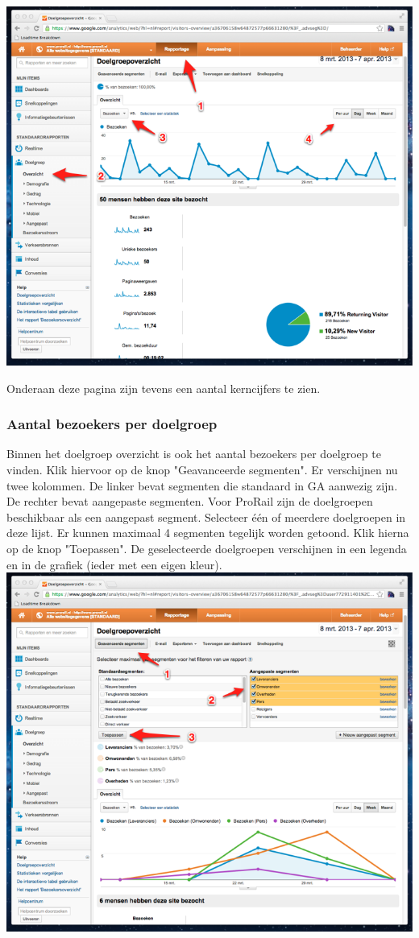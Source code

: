 \includegraphics[width=\textwidth]{img/stats1.png}

Onderaan deze pagina zijn tevens een aantal kerncijfers te zien.

\clearpage
\subsubsection{Aantal bezoekers per doelgroep}

Binnen het doelgroep overzicht is ook het aantal bezoekers per doelgroep te vinden. Klik hiervoor op de knop "Geavanceerde segmenten". Er verschijnen nu twee kolommen. De linker bevat segmenten die standaard in GA aanwezig zijn. De rechter bevat aangepaste segmenten. Voor ProRail zijn de doelgroepen beschikbaar als een aangepast segment. Selecteer \'{e}\'{e}n of meerdere doelgroepen in deze lijst. Er kunnen maximaal 4 segmenten tegelijk worden getoond. Klik hierna op de knop "Toepassen". De geselecteerde doelgroepen verschijnen in een legenda en in de grafiek (ieder met een eigen kleur).
\\

\includegraphics[width=\textwidth]{img/stats2.png}

